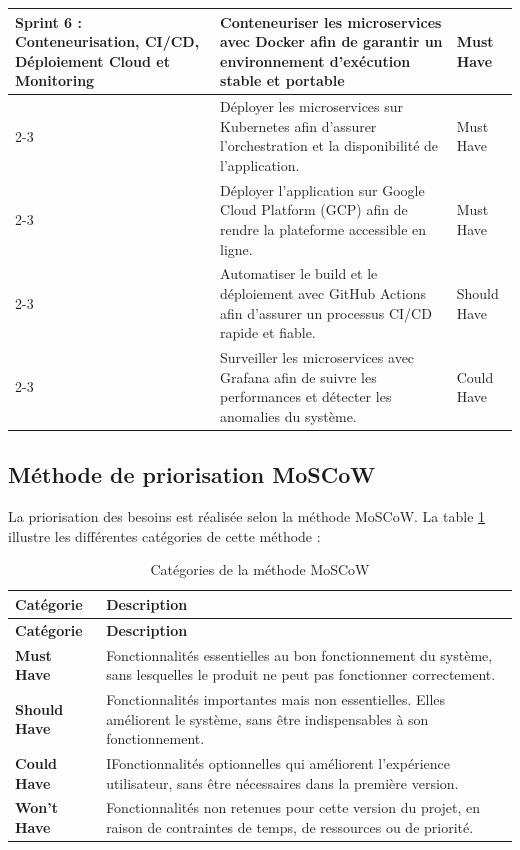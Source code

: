 \begin{longtable}{|p{4cm}|p{9.5cm}|p{2cm}|}
\multirow{4}{4cm}{\textbf{Sprint 6 : Conteneurisation, CI/CD, Déploiement Cloud et Monitoring}}
& Conteneuriser les microservices avec Docker afin de garantir un environnement d’exécution stable et portable & Must Have \\
\cline{2-3}
& Déployer les microservices sur Kubernetes afin d’assurer l’orchestration et la disponibilité de l’application. & Must Have \\
\cline{2-3}
& Déployer l’application sur Google Cloud Platform (GCP) afin de rendre la plateforme accessible en ligne. & Must Have \\
\cline{2-3}
& Automatiser le build et le déploiement avec GitHub Actions afin d’assurer un processus CI/CD rapide et fiable. & Should Have \\  
\cline{2-3}
& Surveiller les microservices avec Grafana afin de suivre les performances et détecter les anomalies du système. & Could Have \\
\hline


\end{longtable} 

\newpage
\subsection{Méthode de priorisation MoSCoW}

La priorisation des besoins est réalisée selon la méthode MoSCoW. La table \ref{tab:moscow} illustre les différentes catégories de cette méthode :



\begin{longtable}{|p{3.5cm}|p{12cm}|}
\caption{Catégories de la méthode MoSCoW}
\label{tab:moscow} \\
\hline
\rowcolor{coloranihub}
\textbf{Catégorie} & \textbf{Description} \\
\hline
\endfirsthead

\hline
\rowcolor{coloranihub}
\textbf{Catégorie} & \textbf{Description} \\
\hline
\endhead

\textbf{Must Have} & Fonctionnalités essentielles au bon fonctionnement du système, sans lesquelles le produit ne peut pas fonctionner correctement. \\
\hline

\textbf{Should Have} & Fonctionnalités importantes mais non essentielles. Elles améliorent le système, sans être indispensables à son fonctionnement. \\
\hline

\textbf{Could Have} & IFonctionnalités optionnelles qui améliorent l’expérience utilisateur, sans être nécessaires dans la première version. \\
\hline

\textbf{Won’t Have} & Fonctionnalités non retenues pour cette version du projet, en raison de contraintes de temps, de ressources ou de priorité. \\
\hline

\end{longtable}

